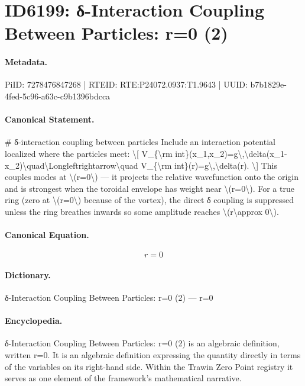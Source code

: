 \section*{ID6199: δ-Interaction Coupling Between Particles: r=0 (2)}
\paragraph{Metadata.}
PiID: 7278476847268 | RTEID: RTE:P24072.0937:T1.9643 | UUID: b7b1829e-4fed-5c96-a63c-c9b1396bdcca

\paragraph{Canonical Statement.}
\# δ-interaction coupling between particles Include an interaction potential localized where the particles meet: \textbackslash{}[ V\_\{\textbackslash{}rm int\}(x\_1,x\_2)=g\textbackslash{},\textbackslash{}delta(x\_1-x\_2)\textbackslash{}quad\textbackslash{}Longleftrightarrow\textbackslash{}quad V\_\{\textbackslash{}rm int\}(r)=g\textbackslash{},\textbackslash{}delta(r). \textbackslash{}] This couples modes at \textbackslash{}(r=0\textbackslash{}) — it projects the relative wavefunction onto the origin and is strongest when the toroidal envelope has weight near \textbackslash{}(r=0\textbackslash{}). For a true ring (zero at \textbackslash{}(r=0\textbackslash{}) because of the vortex), the direct δ coupling is suppressed unless the ring breathes inwards so some amplitude reaches \textbackslash{}(r\textbackslash{}approx 0\textbackslash{}).

\paragraph{Canonical Equation.}
\[
r=0
\]

\paragraph{Dictionary.}
δ-Interaction Coupling Between Particles: r=0 (2) — r=0

\paragraph{Encyclopedia.}
δ-Interaction Coupling Between Particles: r=0 (2) is an algebraic definition, written r=0. It is an algebraic definition expressing the quantity directly in terms of the variables on its right-hand side. Within the Trawin Zero Point registry it serves as one element of the framework's mathematical narrative.
